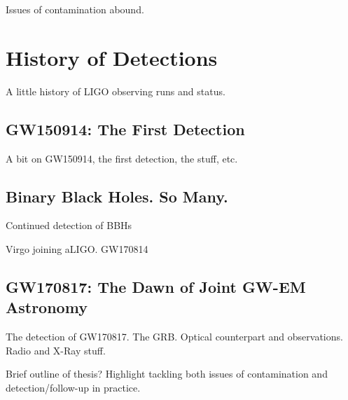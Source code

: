 Issues of contamination abound.

\section{History of Detections}
\label{sec:intro_history}
A little history of LIGO observing runs and status.

\subsection{GW150914: The First Detection}
\label{sec:intro_gw150914}
A bit on GW150914, the first detection, the \fermi stuff, etc.

\subsection{Binary Black Holes. So Many.}
Continued detection of BBHs

Virgo joining aLIGO. GW170814

\subsection{GW170817: The Dawn of Joint GW-EM Astronomy}
The detection of GW170817. The GRB. Optical counterpart and observations. Radio and X-Ray stuff.

Brief outline of thesis? Highlight tackling both issues of contamination and detection/follow-up in practice.

